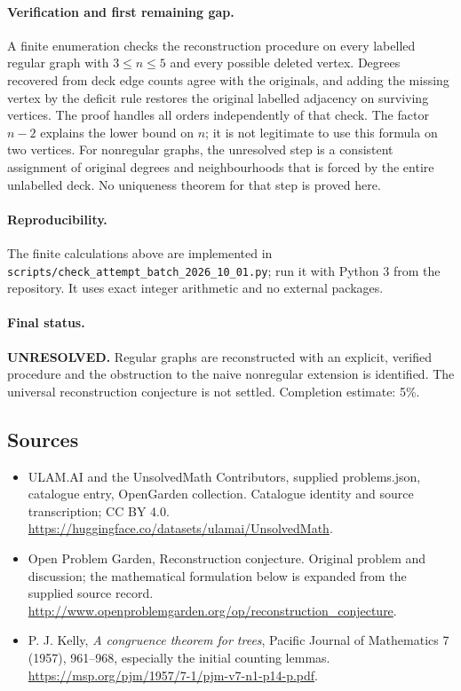 \documentclass[11pt,a4paper]{article}
\begin{document}
\paragraph{Verification and first remaining gap.}
A finite enumeration checks the reconstruction procedure on every labelled
regular graph with $3\le n\le5$ and every possible deleted vertex. Degrees
recovered from deck edge counts agree with the originals, and adding the
missing vertex by the deficit rule restores the original labelled adjacency
on surviving vertices. The proof handles all orders independently of that
check. The factor $n-2$ explains the lower bound on $n$; it is not legitimate
to use this formula on two vertices. For nonregular graphs, the unresolved
step is a consistent assignment of original degrees and neighbourhoods that
is forced by the entire unlabelled deck. No uniqueness theorem for that step
is proved here.

\paragraph{Reproducibility.}
The finite calculations above are implemented in
\texttt{scripts/check\_attempt\_batch\_2026\_10\_01.py}; run it with Python 3
from the repository. It uses exact integer arithmetic and no external packages.

\paragraph{Final status.}
\textbf{UNRESOLVED.} Regular graphs are reconstructed with an explicit,
verified procedure and the obstruction to the naive nonregular extension is
identified. The universal reconstruction conjecture is not settled.
Completion estimate: 5\%.

\subsection{Sources}
\begin{itemize}
\item[S1] ULAM.AI and the UnsolvedMath Contributors, supplied problems.json, catalogue entry, OpenGarden collection. Catalogue identity and source transcription; CC BY 4.0.
\url{https://huggingface.co/datasets/ulamai/UnsolvedMath}.
\item[S2] Open Problem Garden, Reconstruction conjecture. Original problem and discussion; the mathematical formulation below is expanded from the supplied source record.
\url{http://www.openproblemgarden.org/op/reconstruction_conjecture}.
\item[A1] P. J. Kelly, \emph{A congruence theorem for trees}, Pacific Journal of Mathematics 7 (1957), 961--968, especially the initial counting lemmas. \url{https://msp.org/pjm/1957/7-1/pjm-v7-n1-p14-p.pdf}.
\end{itemize}
\end{document}
